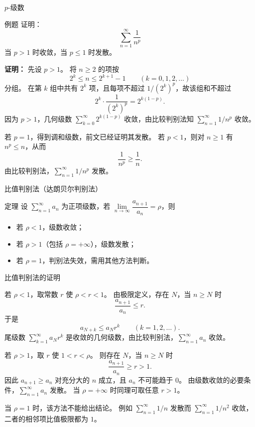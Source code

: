 \documentclass[aspectratio=169,10pt]{ctexbeamer}
\begin{document}
\begin{frame}{\(p\)-级数}
	\scriptsize	
	\begin{block}{例题}
		证明：
		\[
		\sum_{n=1}^{\infty} \dfrac{1}{n^p}
		\]
		当 \(p > 1\) 时收敛，当 \(p \leq 1\) 时发散。
	\end{block}
	\pause
	\textbf{证明：}
	先设 $p>1$。 将 $n\ge2$ 的项按
	\[
	2^k\le n\le 2^{k+1}-1\qquad(k=0,1,2,\ldots)
	\]
	分组。 在第 $k$ 组中共有 $2^k$ 项，且每项不超过 $1/(2^k)^p$，故该组和不超过
	\[
	2^k\cdot \frac{1}{(2^k)^p}=2^{k(1-p)}.
	\]
	因为 $p>1$，几何级数 $\sum\limits_{k = 0}^{  \infty }2^{k(1-p)}$ 收敛，由比较判别法知 $\sum\limits_{n = 1}^{  \infty } 1/n^p$ 收敛。
	
	若 $p=1$，得到调和级数，前文已经证明其发散。 若 $p<1$，则对 $n\ge1$ 有 $n^p\le n$，从而
	\[
	\frac1{n^p}\ge \frac1n.
	\]
	由比较判别法，$\sum\limits_{n = 1}^{  \infty } 1/n^p$ 发散。
	
\end{frame}


\begin{frame}{比值判别法（达朗贝尔判别法）}
	\normalsize
	\begin{block}{定理}
		设 \(\sum\limits_{n = 1}^{  \infty }a_n\) 为正项级数，若 \(\lim\limits_{n\to\infty}\dfrac{a_{n+1}}{a_n}=\rho\)，则
		\begin{itemize}
			\item 若 \(\rho < 1\)，级数收敛；
			\item 若 \(\rho > 1\)（包括 \(\rho = +\infty\)），级数发散；
			\item 若 \(\rho = 1\)，判别法失效，需用其他方法判断。
		\end{itemize}
	\end{block}

	

	
\end{frame}




\begin{frame}{比值判别法的证明}
	
		若 $\rho<1$，取常数 $r$ 使 $\rho<r<1$。 由极限定义，存在 $N$，当 $n\ge N$ 时
	\[
	\frac{a_{n+1}}{a_n}\le r.
	\]
	于是
	\[
	a_{N+k}\le a_N r^k\qquad(k=1,2,\ldots).
	\]
	尾级数 $\sum\limits_{k = 1}^{  \infty }a_N r^k$ 是收敛的几何级数，由比较判别法，$\sum\limits_{n = 1}^{  \infty } a_n$ 收敛。
	
	若 $\rho>1$，取 $r$ 使 $1<r<\rho$。 则存在 $N$，当 $n\ge N$ 时
	\[
	\frac{a_{n+1}}{a_n}\ge r>1.
	\]
	因此 $a_{n+1}\ge a_n$ 对充分大的 $n$ 成立，且 $a_n$ 不可能趋于 $0$。 由级数收敛的必要条件，$\sum\limits_{n = 1}^{  \infty } a_n$ 发散。 当 $\rho=+\infty$ 时同理可取任意 $r>1$。
	
	当 $\rho=1$ 时，该方法不能给出结论。 例如 $\sum\limits_{n = 1}^{  \infty } 1/n$ 发散而 $\sum\limits_{n = 1}^{  \infty } 1/n^2$ 收敛，二者的相邻项比值极限都为 $1$。
\end{frame}
\end{document}
